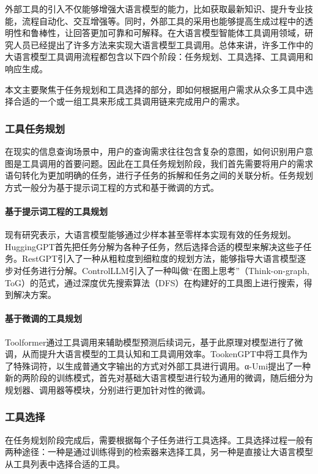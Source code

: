 外部工具的引入不仅能够增强大语言模型的能力，比如获取最新知识、提升专业技能，流程自动化、交互增强等。同时，外部工具的采用也能够提高生成过程中的透明性和鲁棒性，让回答更加可靠和可解释。在大语言模型智能体工具调用领域，研究人员已经提出了许多方法来实现大语言模型工具调用。总体来讲，许多工作中的大语言模型工具调用流程都包含以下四个阶段：任务规划、工具选择、工具调用和响应生成\cite{Ruan2023, Shen2023, Song2023}。

本文主要聚焦于任务规划和工具选择的部分，即如何根据用户需求从众多工具中选择合适的一个或一组工具来形成工具调用链来完成用户的需求。

\subsubsection{工具任务规划}
在现实的信息查询场景中，用户的查询需求往往包含复杂的意图，如何识别用户意图是工具调用的首要问题。因此在工具任务规划阶段，我们首先需要将用户的需求语句转化为更加明确的任务，进行子任务的拆解和任务之间的关联分析。任务规划方式一般分为基于提示词工程的方式和基于微调的方式。

\paragraph{基于提示词工程的工具规划} 
现有研究\cite{Miao2023}表示，大语言模型能够通过少样本甚至零样本实现有效的任务规划。HuggingGPT\cite{Shen2023}首先把任务分解为各种子任务，然后选择合适的模型来解决这些子任务。RestGPT\cite{Song2023}引入了一种从粗粒度到细粒度的规划方法，能够指导大语言模型逐步对任务进行分解。ControlLLM\cite{Liu2023a}引入了一种叫做“在图上思考”（Think-on-graph, ToG）的范式，通过深度优先搜索算法（DFS）在构建好的工具图上进行搜索，得到解决方案。

\paragraph{基于微调的工具规划} 

Toolformer通过工具调用来辅助模型预测后续词元，基于此原理对模型进行了微调，从而提升大语言模型的工具认知和工具调用效率。TookenGPT中将工具作为了特殊词符，以生成普通文字输出的方式对外部工具进行调用。α-Umi提出了一种新的两阶段的训练模式，首先对基础大语言模型进行较为通用的微调，随后细分为规划器、调用器等模块，分别进行更加针对性的微调。

\subsubsection{工具选择}
在任务规划阶段完成后，需要根据每个子任务进行工具选择。工具选择过程一般有两种途径：一种是通过训练得到的检索器来选择工具，另一种是直接让大语言模型从工具列表中选择合适的工具。

